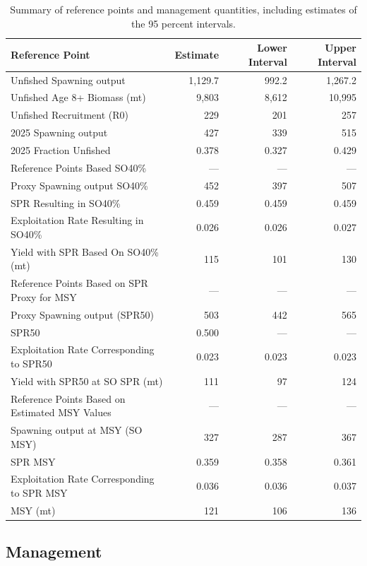 \documentclass[
]{scrartcl}
\begin{document}
\begin{longtable}{lrrr}

\caption{\label{tbl-ref-points-es-2}Summary of reference points and
management quantities, including estimates of the 95 percent intervals.}

\tabularnewline

\toprule
Reference Point & Estimate & Lower Interval & Upper Interval \\ 
\midrule\addlinespace[2.5pt]
Unfished Spawning output & 1,129.7 & 992.2 & 1,267.2 \\ 
Unfished Age 8+ Biomass (mt) & 9,803 & 8,612 & 10,995 \\ 
Unfished Recruitment (R0) & 229 & 201 & 257 \\ 
2025 Spawning output & 427 & 339 & 515 \\ 
2025 Fraction Unfished & 0.378 & 0.327 & 0.429 \\ 
Reference Points Based SO40\% & — & — & — \\ 
Proxy Spawning output SO40\% & 452 & 397 & 507 \\ 
SPR Resulting in SO40\% & 0.459 & 0.459 & 0.459 \\ 
Exploitation Rate Resulting in SO40\% & 0.026 & 0.026 & 0.027 \\ 
Yield with SPR Based On SO40\% (mt) & 115 & 101 & 130 \\ 
Reference Points Based on SPR Proxy for MSY & — & — & — \\ 
Proxy Spawning output (SPR50) & 503 & 442 & 565 \\ 
SPR50 & 0.500 & — & — \\ 
Exploitation Rate Corresponding to SPR50 & 0.023 & 0.023 & 0.023 \\ 
Yield with SPR50 at SO SPR (mt) & 111 & 97 & 124 \\ 
Reference Points Based on Estimated MSY Values & — & — & — \\ 
Spawning output at MSY (SO MSY) & 327 & 287 & 367 \\ 
SPR MSY & 0.359 & 0.358 & 0.361 \\ 
Exploitation Rate Corresponding to SPR MSY & 0.036 & 0.036 & 0.037 \\ 
MSY (mt) & 121 & 106 & 136 \\ 
\bottomrule

\end{longtable}

\endgroup

\subsection{Management}\label{management-1}
\end{document}
